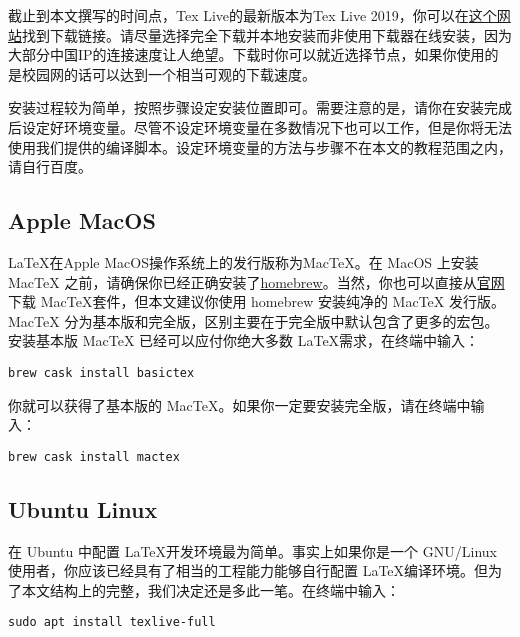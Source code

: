 截止到本文撰写的时间点，Tex Live的最新版本为Tex Live 2019，你可以在\href{http://tug.org/texlive/}{这个网站}找到下载链接。请尽量选择完全下载并本地安装而非使用下载器在线安装，因为大部分中国IP的连接速度让人绝望。下载时你可以就近选择节点，如果你使用的是校园网的话可以达到一个相当可观的下载速度。

安装过程较为简单，按照步骤设定安装位置即可。需要注意的是，请你在安装完成后设定好环境变量。尽管不设定环境变量在多数情况下也可以工作，但是你将无法使用我们提供的编译脚本。设定环境变量的方法与步骤不在本文的教程范围之内，请自行百度。

\subsection{Apple MacOS\texttrademark}

\LaTeX 在Apple MacOS操作系统上的发行版称为MacTeX。在 MacOS 上安装 MacTeX 之前，请确保你已经正确安装了\href{https://brew.sh/}{homebrew}。当然，你也可以直接从\href{http://www.tug.org/mactex/index.html}{官网}下载 MacTeX套件，但本文建议你使用 homebrew 安装纯净的 MacTeX 发行版。MacTeX 分为基本版和完全版，区别主要在于完全版中默认包含了更多的宏包。安装基本版 MacTeX 已经可以应付你绝大多数 \LaTeX 需求，在终端中输入：

\begin{tcolorbox}
\begin{lstlisting}
brew cask install basictex
\end{lstlisting}
\end{tcolorbox}

\noindent 你就可以获得了基本版的 MacTeX。如果你一定要安装完全版，请在终端中输入：

\begin{tcolorbox}
\begin{lstlisting}
brew cask install mactex
\end{lstlisting}
\end{tcolorbox}

\subsection{Ubuntu Linux}

在 Ubuntu 中配置 \LaTeX 开发环境最为简单。事实上如果你是一个 GNU/Linux 使用者，你应该已经具有了相当的工程能力能够自行配置 \LaTeX 编译环境。但为了本文结构上的完整，我们决定还是多此一笔。在终端中输入：

\begin{tcolorbox}
\begin{lstlisting}
sudo apt install texlive-full
\end{lstlisting}
\end{tcolorbox}

